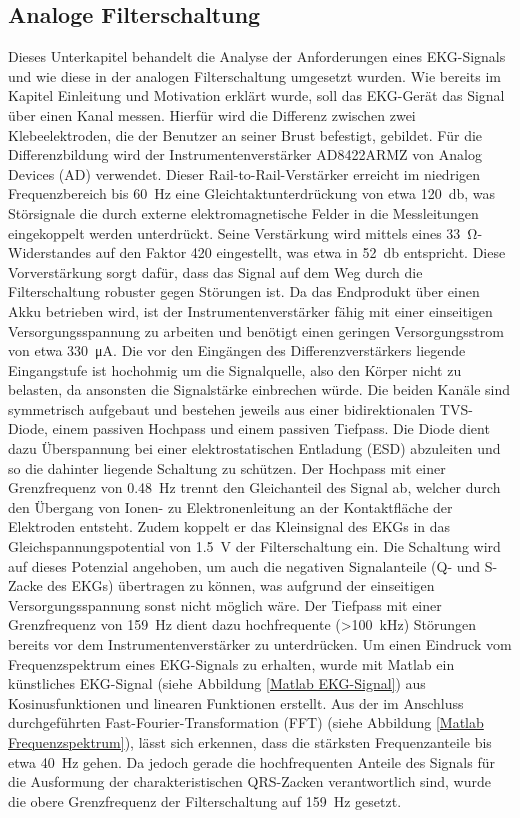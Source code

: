 
\subsection{Analoge Filterschaltung}

Dieses Unterkapitel behandelt die Analyse der Anforderungen eines EKG-Signals und wie diese in der analogen Filterschaltung umgesetzt wurden. Wie bereits im Kapitel Einleitung und Motivation erklärt wurde, soll das EKG-Gerät das Signal über einen Kanal messen. Hierfür wird die Differenz zwischen zwei Klebeelektroden, die der Benutzer an seiner Brust befestigt, gebildet. Für die Differenzbildung wird der Instrumentenverstärker AD8422ARMZ von Analog Devices (AD) verwendet. Dieser Rail-to-Rail-Verstärker erreicht im niedrigen Frequenzbereich bis \SI{60}{\hertz} eine Gleichtaktunterdrückung von etwa \SI{120}{\decibel}, was Störsignale die durch externe elektromagnetische Felder in die Messleitungen eingekoppelt werden unterdrückt. Seine Verstärkung wird mittels eines \SI{33}{\ohm}-Widerstandes auf den Faktor 420 eingestellt, was etwa in \SI{52}{\decibel} entspricht. Diese Vorverstärkung sorgt dafür, dass das Signal auf dem Weg durch die Filterschaltung robuster gegen Störungen ist. Da das Endprodukt über einen Akku betrieben wird, ist der Instrumentenverstärker fähig mit einer einseitigen Versorgungsspannung zu arbeiten und benötigt einen geringen Versorgungsstrom von etwa \SI{330}{\micro\ampere}. Die vor den Eingängen des Differenzverstärkers liegende Eingangstufe ist hochohmig um die Signalquelle, also den Körper nicht zu belasten, da ansonsten die Signalstärke einbrechen würde. Die beiden Kanäle sind symmetrisch aufgebaut und bestehen jeweils aus einer bidirektionalen TVS-Diode, einem passiven Hochpass und einem passiven Tiefpass. Die Diode dient dazu Überspannung bei einer elektrostatischen Entladung (ESD) abzuleiten und so die dahinter liegende Schaltung zu schützen. Der Hochpass mit einer Grenzfrequenz von \SI{0,48}{\hertz} trennt den Gleichanteil des Signal ab, welcher durch den Übergang von Ionen- zu Elektronenleitung an der Kontaktfläche der Elektroden entsteht. Zudem koppelt er das Kleinsignal des EKGs in das Gleichspannungspotential von \SI{1,5}{\volt} der Filterschaltung ein. Die Schaltung wird auf dieses Potenzial angehoben, um auch die negativen Signalanteile (Q- und S-Zacke des EKGs) übertragen zu können, was aufgrund der einseitigen Versorgungsspannung sonst nicht möglich wäre. Der Tiefpass mit einer Grenzfrequenz von \SI{159}{\hertz} dient dazu hochfrequente (>\SI{100}{\kilo\hertz}) Störungen bereits vor dem Instrumentenverstärker zu unterdrücken. Um einen Eindruck vom Frequenzspektrum eines EKG-Signals zu erhalten, wurde mit Matlab ein künstliches EKG-Signal (siehe Abbildung \ref{Matlab EKG-Signal}) aus Kosinusfunktionen und linearen Funktionen erstellt. Aus der im Anschluss durchgeführten Fast-Fourier-Transformation (FFT) (siehe Abbildung \ref{Matlab Frequenzspektrum}), lässt sich erkennen, dass die stärksten Frequenzanteile bis etwa \SI{40}{\hertz} gehen. Da jedoch gerade die hochfrequenten Anteile des Signals für die Ausformung der charakteristischen QRS-Zacken verantwortlich sind, wurde die obere Grenzfrequenz der Filterschaltung auf \SI{159}{\hertz} gesetzt. 

